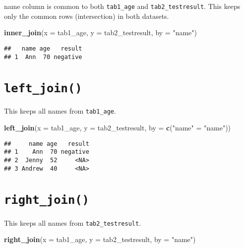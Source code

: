 \documentclass[]{article}
\newenvironment{Shaded}{\begin{snugshade}}{\end{snugshade}}
\newcommand{\DataTypeTok}[1]{\textcolor[rgb]{0.13,0.29,0.53}{#1}}
\newcommand{\KeywordTok}[1]{\textcolor[rgb]{0.13,0.29,0.53}{\textbf{#1}}}
\newcommand{\NormalTok}[1]{#1}
\newcommand{\StringTok}[1]{\textcolor[rgb]{0.31,0.60,0.02}{#1}}
\begin{document}
name column is common to both \texttt{tab1\_age} and
\texttt{tab2\_testresult}. This keeps only the common rows
(intersection) in both datasets.

\begin{Shaded}
\begin{Highlighting}[]
\KeywordTok{inner_join}\NormalTok{(}\DataTypeTok{x =}\NormalTok{ tab1_age, }\DataTypeTok{y =}\NormalTok{ tab2_testresult, }\DataTypeTok{by =} \StringTok{"name"}\NormalTok{)}
\end{Highlighting}
\end{Shaded}

\begin{verbatim}
##   name age   result
## 1  Ann  70 negative
\end{verbatim}

\hypertarget{left_join}{%
\section{\texorpdfstring{\texttt{left\_join()}}{left\_join()}}\label{left_join}}

This keeps all names from \texttt{tab1\_age}.

\begin{Shaded}
\begin{Highlighting}[]
\KeywordTok{left_join}\NormalTok{(}\DataTypeTok{x =}\NormalTok{ tab1_age, }\DataTypeTok{y =}\NormalTok{ tab2_testresult, }\DataTypeTok{by =} \KeywordTok{c}\NormalTok{(}\StringTok{"name"}\NormalTok{ =}\StringTok{ "name"}\NormalTok{))}
\end{Highlighting}
\end{Shaded}

\begin{verbatim}
##     name age   result
## 1    Ann  70 negative
## 2  Jenny  52     <NA>
## 3 Andrew  40     <NA>
\end{verbatim}

\hypertarget{right_join}{%
\section{\texorpdfstring{\texttt{right\_join()}}{right\_join()}}\label{right_join}}

This keeps all names from \texttt{tab2\_testresult}.

\begin{Shaded}
\begin{Highlighting}[]
\KeywordTok{right_join}\NormalTok{(}\DataTypeTok{x =}\NormalTok{ tab1_age, }\DataTypeTok{y =}\NormalTok{ tab2_testresult, }\DataTypeTok{by =} \StringTok{"name"}\NormalTok{)}
\end{Highlighting}
\end{Shaded}
\end{document}
